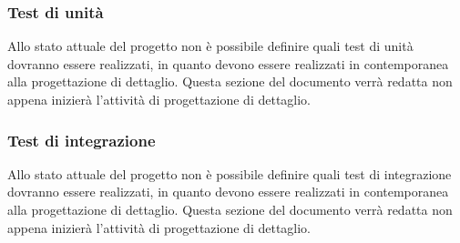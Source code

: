 \subsubsection{Test di unità}
Allo stato attuale del progetto non è possibile definire quali test di unità dovranno essere realizzati, in quanto devono essere realizzati in contemporanea alla progettazione di dettaglio. Questa sezione del documento verrà redatta non appena inizierà l'attività di progettazione di dettaglio.

\subsubsection{Test di integrazione}
Allo stato attuale del progetto non è possibile definire quali test di integrazione dovranno essere realizzati, in quanto devono essere realizzati in contemporanea alla progettazione di dettaglio.
Questa sezione del documento verrà redatta non appena inizierà l'attività di progettazione di dettaglio.

